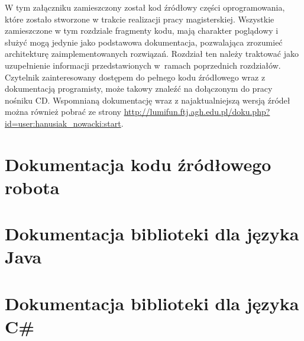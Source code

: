 \label{ch:source-code}
W tym załączniku zamieszczony został kod źródłowy części oprogramowania,
które zostało stworzone w trakcie realizacji pracy magisterskiej. Wszystkie
zamieszczone w tym rozdziale fragmenty kodu, mają charakter poglądowy i służyć
mogą jedynie jako podstawowa dokumentacja, pozwalająca zrozumieć architekturę
zaimplementowanych rozwiązań. Rozdział ten należy traktować jako
uzupełnienie informacji przedstawionych w~ramach poprzednich rozdziałów.
Czytelnik zainteresowany dostępem do pełnego kodu źródłowego wraz z dokumentacją
programisty, może takowy znaleźć na dołączonym do pracy nośniku CD. Wspomnianą
dokumentację wraz z najaktualniejszą wersją źródeł można również pobrać ze
strony \url{http://lumifun.ftj.agh.edu.pl/doku.php?id=user:hanusiak_nowacki:start}.

\section{Dokumentacja kodu źródłowego robota}
\section{Dokumentacja biblioteki dla języka Java}
 

\section{Dokumentacja biblioteki dla języka C\#}
 


 